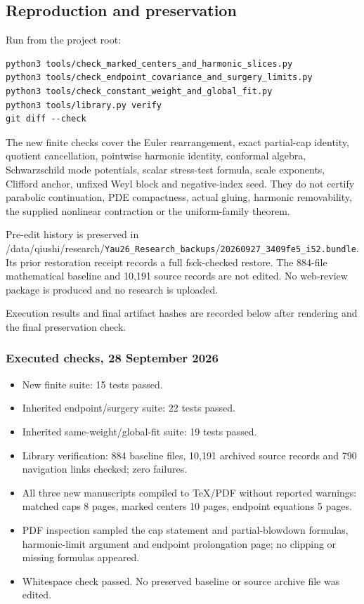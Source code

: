 \documentclass[
  10pt,
]{article}
\providecommand{\tightlist}{%
  \setlength{\itemsep}{0pt}\setlength{\parskip}{0pt}}
\begin{document}
\hypertarget{reproduction-and-preservation}{%
\subsection{Reproduction and
preservation}\label{reproduction-and-preservation}}

Run from the project root:

\begin{verbatim}
python3 tools/check_marked_centers_and_harmonic_slices.py
python3 tools/check_endpoint_covariance_and_surgery_limits.py
python3 tools/check_constant_weight_and_global_fit.py
python3 tools/library.py verify
git diff --check
\end{verbatim}

The new finite checks cover the Euler rearrangement, exact partial-cap
identity, quotient cancellation, pointwise harmonic identity, conformal
algebra, Schwarzschild mode potentials, scalar stress-test formula,
scale exponents, Clifford anchor, unfixed Weyl block and negative-index
seed. They do not certify parabolic continuation, PDE compactness,
actual gluing, harmonic removability, the supplied nonlinear contraction
or the uniform-family theorem.

Pre-edit history is preserved in
/data/qiushi/research/\nolinkurl{Yau26_Research_backups}/\nolinkurl{20260927_3409fe5_i52.bundle}.
Its prior restoration receipt records a full fsck-checked restore. The
884-file mathematical baseline and 10,191 source records are not edited.
No web-review package is produced and no research is uploaded.

Execution results and final artifact hashes are recorded below after
rendering and the final preservation check.

\hypertarget{executed-checks-28-september-2026}{%
\subsubsection{Executed checks, 28 September
2026}\label{executed-checks-28-september-2026}}

\begin{itemize}
\tightlist
\item
  New finite suite: 15 tests passed.
\item
  Inherited endpoint/surgery suite: 22 tests passed.
\item
  Inherited same-weight/global-fit suite: 19 tests passed.
\item
  Library verification: 884 baseline files, 10,191 archived source
  records and 790 navigation links checked; zero failures.
\item
  All three new manuscripts compiled to TeX/PDF without reported
  warnings: matched caps 8 pages, marked centers 10 pages, endpoint
  equations 5 pages.
\item
  PDF inspection sampled the cap statement and partial-blowdown
  formulas, harmonic-limit argument and endpoint prolongation page; no
  clipping or missing formulas appeared.
\item
  Whitespace check passed. No preserved baseline or source archive file
  was edited.
\end{itemize}
\end{document}

